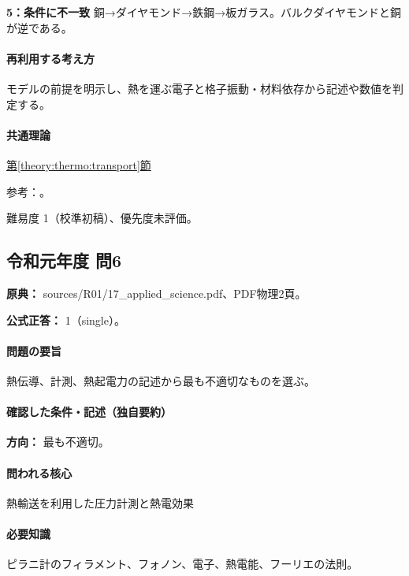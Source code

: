 \noindent\textbf{5：条件に不一致} 銅→ダイヤモンド→鉄鋼→板ガラス。バルクダイヤモンドと銅が逆である。\par

\paragraph{再利用する考え方} モデルの前提を明示し、熱を運ぶ電子と格子振動・材料依存から記述や数値を判定する。

\paragraph{共通理論} \hyperref[theory:thermo:transport]{第\ref*{theory:thermo:transport}節}

\par 参考：\cite{aist_metal_thermal,wang_sun_diamond2024,agc_glass_thermal}。

\par 難易度 1（校準初稿）、優先度未評価。

\subsection{令和元年度 問6}
\label{q:r01-reg-applied-06}

\noindent\textbf{原典：} sources/R01/17\_applied\_science.pdf、PDF物理2頁。

\textbf{公式正答：} 1（single）。

\paragraph{問題の要旨} 熱伝導、計測、熱起電力の記述から最も不適切なものを選ぶ。

\paragraph{確認した条件・記述（独自要約）}\mbox{}\par

\noindent\textbf{方向：} 最も不適切。\par

\paragraph{問われる核心} 熱輸送を利用した圧力計測と熱電効果

\paragraph{必要知識} ピラニ計のフィラメント、フォノン、電子、熱電能、フーリエの法則。


